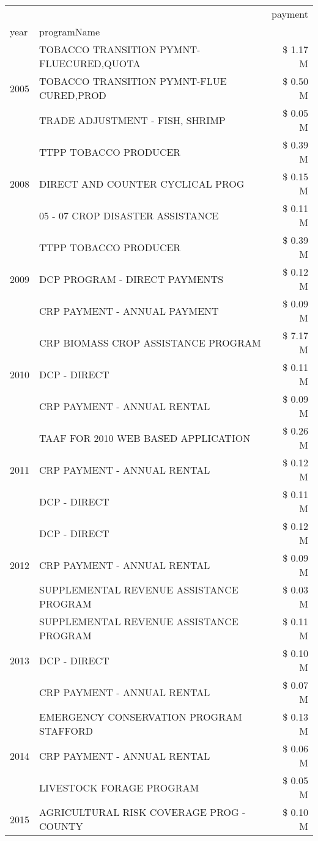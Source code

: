 \begin{tabular}{llr}
\toprule
 &  & payment \\
year & programName &  \\
\midrule
\multirow[t]{3}{*}{2005} & TOBACCO TRANSITION PYMNT-FLUECURED,QUOTA & \$ 1.17 M \\
 & TOBACCO TRANSITION PYMNT-FLUE CURED,PROD & \$ 0.50 M \\
 & TRADE ADJUSTMENT - FISH, SHRIMP & \$ 0.05 M \\
\cline{1-3}
\multirow[t]{3}{*}{2008} & TTPP TOBACCO PRODUCER & \$ 0.39 M \\
 & DIRECT AND COUNTER CYCLICAL PROG & \$ 0.15 M \\
 & 05 - 07 CROP DISASTER ASSISTANCE & \$ 0.11 M \\
\cline{1-3}
\multirow[t]{3}{*}{2009} & TTPP TOBACCO PRODUCER & \$ 0.39 M \\
 & DCP PROGRAM - DIRECT PAYMENTS & \$ 0.12 M \\
 & CRP PAYMENT - ANNUAL PAYMENT & \$ 0.09 M \\
\cline{1-3}
\multirow[t]{3}{*}{2010} & CRP BIOMASS CROP ASSISTANCE PROGRAM & \$ 7.17 M \\
 & DCP - DIRECT & \$ 0.11 M \\
 & CRP PAYMENT - ANNUAL RENTAL & \$ 0.09 M \\
\cline{1-3}
\multirow[t]{3}{*}{2011} & TAAF FOR 2010 WEB BASED APPLICATION & \$ 0.26 M \\
 & CRP PAYMENT - ANNUAL RENTAL & \$ 0.12 M \\
 & DCP - DIRECT & \$ 0.11 M \\
\cline{1-3}
\multirow[t]{3}{*}{2012} & DCP - DIRECT & \$ 0.12 M \\
 & CRP PAYMENT - ANNUAL RENTAL & \$ 0.09 M \\
 & SUPPLEMENTAL REVENUE ASSISTANCE PROGRAM & \$ 0.03 M \\
\cline{1-3}
\multirow[t]{3}{*}{2013} & SUPPLEMENTAL REVENUE ASSISTANCE PROGRAM & \$ 0.11 M \\
 & DCP - DIRECT & \$ 0.10 M \\
 & CRP PAYMENT - ANNUAL RENTAL & \$ 0.07 M \\
\cline{1-3}
\multirow[t]{3}{*}{2014} & EMERGENCY CONSERVATION PROGRAM STAFFORD & \$ 0.13 M \\
 & CRP PAYMENT - ANNUAL RENTAL & \$ 0.06 M \\
 & LIVESTOCK FORAGE PROGRAM & \$ 0.05 M \\
\cline{1-3}
\multirow[t]{3}{*}{2015} & AGRICULTURAL RISK COVERAGE PROG - COUNTY & \$ 0.10 M \\

\end{tabular}
